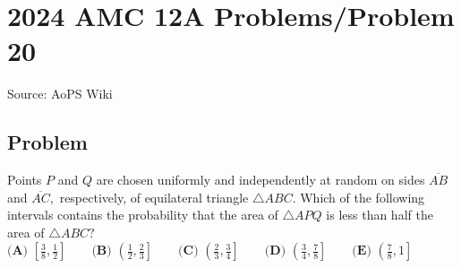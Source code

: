 \documentclass[12pt]{article}
\begin{document}
\section*{{2024 AMC 12A Problems/Problem 20}}
Source: AoPS Wiki

\subsection*{Problem}
Points $P$ and $Q$ are chosen uniformly and independently at random on sides $\overline {AB}$ and $\overline{AC},$ respectively, of equilateral triangle $\triangle ABC.$ Which of the following intervals contains the probability that the area of $\triangle APQ$ is less than half the area of $\triangle ABC?$ $\textbf{(A) } \left[\frac 38, \frac 12\right] \qquad \textbf{(B) } \left(\frac 12, \frac 23\right] \qquad \textbf{(C) } \left(\frac 23, \frac 34\right] \qquad \textbf{(D) } \left(\frac 34, \frac 78\right] \qquad \textbf{(E) } \left(\frac 78, 1\right]$
\end{document}
